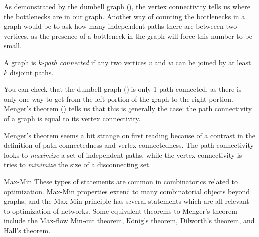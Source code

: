 As demonstrated by the dumbell graph (), the vertex connectivity tells us where the bottlenecks are in our graph. 
Another way of counting the bottlenecks in a graph would be to ask how many independent paths there are betweeen two vertices, as the presence of a bottleneck in the graph will force this number to be small.
\begin{definition} 
	A graph is \emph{$k$-path connected} if any two vertices $v$ and $w$ can be joined by at least $k$ disjoint paths. 
\end{definition}
You can check that  the dumbell graph () is only 1-path connected, as there is only one way to get from the left portion of the graph to the right portion. Menger's theorem () tells us that this is generally the case: the path connectivity of a graph is equal to its vertex connectivity.

Menger's theorem seems a bit strange on first reading because of a contrast in the definition of path connectedness and vertex connectedness. 
The path connectivity looks to  \emph{maximize} a set of independent paths, while the vertex connectivity is tries to  \emph{minimize} the size of a disconnecting set.

\begin{projectdescription}{Max-Min}
These types of statements are common in combinatorics related to optimization.
Max-Min properties extend to many combinatorial  \label{proj:maxmin}  objects beyond graphs,  and the Max-Min principle has several statements which are all relevant to optimization of networks.  Some equivalent theorems to Menger's theorem include the Max-flow Min-cut theorem, K\"onig's theorem, Dilworth's theorem, and Hall's theorem.
\end{projectdescription}


